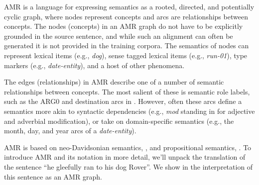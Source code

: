 \documentclass[11pt]{article}
\newcommand\w[1]{\textit{#1}} %
\begin{document}


AMR is a language for expressing semantics as a rooted, directed, and potentially cyclic graph, where nodes represent concepts and arcs are relationships between concepts.
The nodes (concepts) in an AMR graph do not have to be explicitly grounded in the source sentence, and while such an alignment can often be generated it is not provided in the training corpora.
The semantics of nodes can represent lexical items (e.g., \w{dog}), sense tagged lexical items (e.g., \textit{run-01}), type markers (e.g., \textit{date-entity}), and a host of other phenomena.

The edges (relationships) in AMR describe one of a number of semantic relationships between concepts.
The most salient of these is semantic role labels, such as the ARG0 and destination arcs in .
However, often these arcs define a semantics more akin to syntactic dependencies (e.g., \textit{mod} standing in for adjective and adverbial modification), or take on domain-specific semantics (e.g., the month, day, and year arcs of a \textit{date-entity}).

AMR is based on neo-Davidsonian semantics, \cite{Davidson:1967}, and propositional semantics, \cite{Parsons:1990}.
To introduce AMR and its notation in more detail, we'll unpack the translation of the sentence ``he gleefully ran to his dog Rover''. 
We show in  the interpretation of this sentence as an AMR graph.

\end{document}

